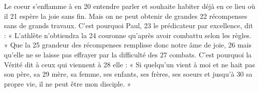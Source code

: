 Le coeur s'enflamme à en	 
20	 	entendre parler et souhaite habiter déjà en ce lieu où il	 
21	 	espère la joie sans fin. Mais on ne peut obtenir de grandes	 
22	 	récompenses sans de grands travaux. C'est pourquoi Paul,	 
23	 	le prédicateur par excellence, dit : « L'athlète n'obtiendra la	 
24	 	couronne qu'après avoir combattu selon les règles. » Que la	 
25	 	grandeur des récompenses remplisse donc notre âme de joie,	 
26	 	mais qu'elle ne se laisse pas effrayer par la difficulté des	 
27	 	combats. C'est pourquoi la Vérité dit à ceux qui viennent à	 
28	 	elle : « Si quelqu'un vient à moi et ne hait pas son père, sa	 
29	 	mère, sa femme, ses enfants, ses frères, ses soeurs et jusqu'à	 
30	 	sa propre vie, il ne peut être mon disciple. »